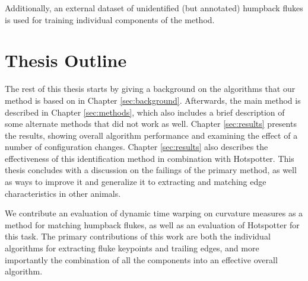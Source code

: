 Additionally, an external dataset of unidentified (but annotated) humpback flukes is used for training individual components of the method.


\section{Thesis Outline}


The rest of this thesis starts by giving a background on the algorithms that our method is based on in Chapter \ref{sec:background}.
Afterwards, the main method is described in Chapter \ref{sec:methods}, which also includes a brief description of some alternate methods that did not work as well.
Chapter \ref{sec:results} presents the results, showing overall algorithm performance and examining the effect of a number of configuration changes.
Chapter \ref{sec:results} also describes the effectiveness of this identification method in combination with Hotspotter.
This thesis concludes with a discussion on the failings of the primary method, as well as ways to improve it and generalize it to extracting and matching edge characteristics in other animals.

We contribute an evaluation of dynamic time warping on curvature measures as a method for matching humpback flukes, as well as an evaluation of Hotspotter for this task.
The primary contributions of this work are both the individual algorithms for extracting fluke keypoints and trailing edges, and more importantly the combination of all the components into an effective overall algorithm.









